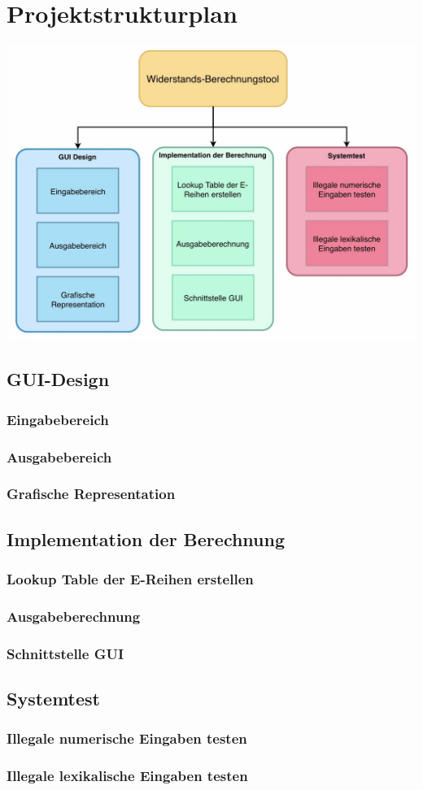 \section{Projektstrukturplan}
\includegraphics[width=14cm]{images/Projektstrukturplan}

\subsection{GUI-Design}
\subsubsection{Eingabebereich}
\subsubsection{Ausgabebereich}
\subsubsection{Grafische Representation}
\subsection{Implementation der Berechnung}
\subsubsection{Lookup Table der E-Reihen erstellen}
\subsubsection{Ausgabeberechnung}
\subsubsection{Schnittstelle GUI}
\subsection{Systemtest}
\subsubsection{Illegale numerische Eingaben testen}
\subsubsection{Illegale lexikalische Eingaben testen}
